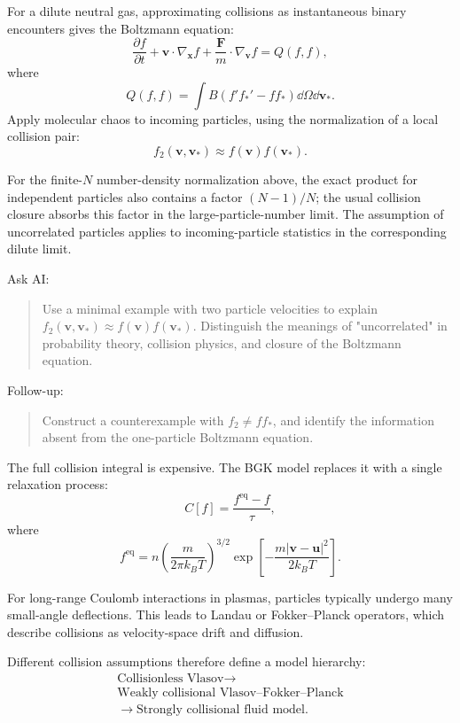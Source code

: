 For a dilute neutral gas, approximating collisions as instantaneous binary encounters gives the Boltzmann equation:
\[
\frac{\partial f}{\partial t}
+\bm v\cdot\nabla_{\bm x}f
+\frac{\bm F}{m}\cdot\nabla_{\bm v}f
=Q(f,f),
\]
where
\[
Q(f,f)
=
\int B\left(f'f_*'-ff_*\right)\dd\Omega\dd\bm v_*.
\]
Apply molecular chaos to incoming particles, using the normalization of a local collision pair:
\[
f_2(\bm v,\bm v_*)\approx f(\bm v)f(\bm v_*).
\]

For the finite-$N$ number-density normalization above, the exact product for independent particles also contains a factor $(N-1)/N$; the usual collision closure absorbs this factor in the large-particle-number limit. The assumption of uncorrelated particles applies to incoming-particle statistics in the corresponding dilute limit.

\begin{askai}
Ask AI:
\begin{quote}
Use a minimal example with two particle velocities to explain \(f_2(\bm v,\bm v_*)\approx f(\bm v)f(\bm v_*)\). Distinguish the meanings of "uncorrelated" in probability theory, collision physics, and closure of the Boltzmann equation.
\end{quote}

Follow-up:
\begin{quote}
Construct a counterexample with \(f_2\neq f f_*\), and identify the information absent from the one-particle Boltzmann equation.
\end{quote}
\end{askai}

The full collision integral is expensive. The BGK model replaces it with a single relaxation process:
\[
C[f]=\frac{f^{\mathrm{eq}}-f}{\tau},
\]
where
\[
f^{\mathrm{eq}}
=
n\left(\frac{m}{2\pi k_BT}\right)^{3/2}
\exp\left[
-\frac{m|\bm v-\bm u|^2}{2k_BT}
\right].
\]

For long-range Coulomb interactions in plasmas, particles typically undergo many small-angle deflections. This leads to Landau or Fokker--Planck operators, which describe collisions as velocity-space drift and diffusion.

Different collision assumptions therefore define a model hierarchy:
\[
\begin{gathered}
\text{Collisionless Vlasov}
\longrightarrow\\
\text{Weakly collisional Vlasov--Fokker--Planck}\\
\longrightarrow
\text{Strongly collisional fluid model}.
\end{gathered}
\]
